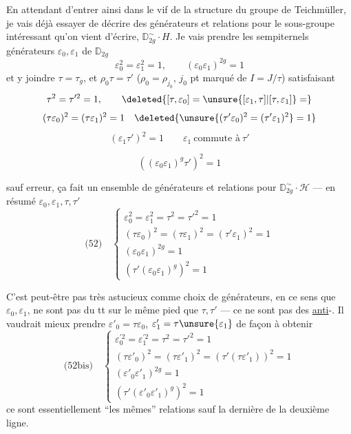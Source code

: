 
En attendant d'entrer ainsi dans le vif de la structure du groupe de Teichmüller, je vais déjà essayer de décrire des générateurs et relations pour le sous-groupe intéressant qu'on vient d'écrire, $\mathbb D_{2g}^{\sim}\cdot H$.
Je vais prendre les sempiternels générateurs $\varepsilon_0,\varepsilon_1$ de $\mathbb D_{2g}$
\[
\varepsilon_0^2=\varepsilon_1^2=1,\qquad (\varepsilon_0\varepsilon_1)^{2g}=1
\]
et y joindre $\tau=\tau_g$, et  $\rho_0\tau=\tau'$
($\rho_0=\rho_{j_0}$, $j_0$ pt marqué de $I=J/\tau$)
satisfaisant
\[
\tau^2=\tau'^2=1,\qquad
\deleted{[\tau,\varepsilon_0]=\unsure{[\varepsilon_1,\tau]|[\tau,\varepsilon_1]}=}
\]
\[
(\tau\varepsilon_0)^2=(\tau\varepsilon_1)^2=1\quad
\deleted{\unsure{(\tau'\varepsilon_0)^2=(\tau'\varepsilon_1)^2}=1}
\]
\[
(\varepsilon_1\tau')^2=1
\qquad \varepsilon_1\ \text{commute à}\ \tau'
\]




\[
((\varepsilon_0\varepsilon_1)^g\tau')^2=1
\]

sauf erreur, ça fait un ensemble de générateurs et relations pour $\mathbb D_{2g}^{\sim}\cdot\mathcal H$ --- en résumé $\varepsilon_0,\varepsilon_1,\tau,\tau'$
\[
\text{(52)}\quad
\left\{
\begin{array}{l}
\varepsilon_0^2=\varepsilon_1^2=\tau^2=\tau'^2=1\\
(\tau\varepsilon_0)^2=(\tau\varepsilon_1)^2=(\tau'\varepsilon_1)^2=1\\
(\varepsilon_0\varepsilon_1)^{2g}=1\\
(\tau'(\varepsilon_0\varepsilon_1)^g)^2=1
\end{array}
\right.
\]

C'est peut-être pas très astucieux comme choix de générateurs, en ce sens que $\varepsilon_0,\varepsilon_1$, ne sont pas du tt sur le même pied que $\tau,\tau'$ --- ce ne sont pas des \uline{anti}-. Il vaudrait mieux prendre $\varepsilon'_0=\tau\varepsilon_0$, $\varepsilon'_1=\tau\unsure{\varepsilon_1}$ de façon à obtenir
\[
\text{(52bis)}\quad
\left\{
\begin{array}{l}
\varepsilon_0^{\prime 2}=\varepsilon_1^{\prime 2}=\tau^2=\tau'^2=1\\
(\tau\varepsilon'_0)^2=(\tau\varepsilon'_1)^2=(\tau'(\tau\varepsilon'_1))^2=1\\
(\varepsilon'_0\varepsilon'_1)^{2g}=1\\
(\tau'(\varepsilon'_0\varepsilon'_1)^g)^2=1
\end{array}
\right.
\]
ce sont essentiellement ``les mêmes'' relations sauf la dernière de la deuxième ligne.

